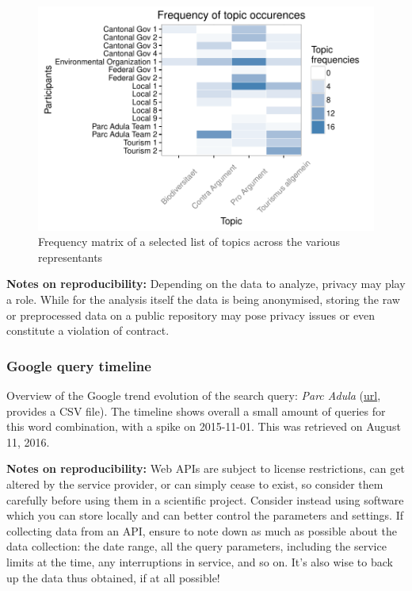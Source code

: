 \documentclass[]{article}
\begin{document}
\begin{figure}[htbp]
\centering
\includegraphics{publication_files/figure-latex/plotfreq-1.pdf}
\caption{Frequency matrix of a selected list of topics across the
various representants}
\end{figure}

\textbf{Notes on reproducibility:} Depending on the data to analyze,
privacy may play a role. While for the analysis itself the data is being
anonymised, storing the raw or preprocessed data on a public repository
may pose privacy issues or even constitute a violation of contract.

\subsubsection{Google query timeline}\label{google-query-timeline}

Overview of the Google trend evolution of the search query: \emph{Parc
Adula}
(\href{https://www.google.com/trends/explore?date=all\&q=parc\%20adula}{url},
provides a CSV file). The timeline shows overall a small amount of
queries for this word combination, with a spike on 2015-11-01. This was
retrieved on August 11, 2016.

\textbf{Notes on reproducibility:} Web APIs are subject to license
restrictions, can get altered by the service provider, or can simply
cease to exist, so consider them carefully before using them in a
scientific project. Consider instead using software which you can store
locally and can better control the parameters and settings. If
collecting data from an API, ensure to note down as much as possible
about the data collection: the date range, all the query parameters,
including the service limits at the time, any interruptions in service,
and so on. It's also wise to back up the data thus obtained, if at all
possible!
\end{document}
